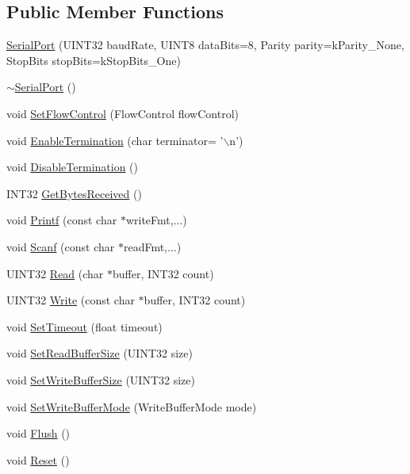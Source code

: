 \subsection*{Public Member Functions}
\begin{DoxyCompactItemize}
\item 
\hyperlink{classSerialPort_a52c48c5f1dd124a65008640efd4d1cd6}{SerialPort} (UINT32 baudRate, UINT8 dataBits=8, Parity parity=kParity\_\-None, StopBits stopBits=kStopBits\_\-One)
\item 
\hyperlink{classSerialPort_a8e09f366ed9b26b0456b66ae7bd8c702}{$\sim$SerialPort} ()
\item 
void \hyperlink{classSerialPort_ad1163b360e467c7c49fcd8467f8d30ad}{SetFlowControl} (FlowControl flowControl)
\item 
void \hyperlink{classSerialPort_a90e27c4191d7ac4e46c614f562505b68}{EnableTermination} (char terminator= '$\backslash$n')
\item 
void \hyperlink{classSerialPort_a347f5209ef059b6e53dbf5aaa397e3ac}{DisableTermination} ()
\item 
INT32 \hyperlink{classSerialPort_aa6894f04f38d747737b3c4dc721c03ea}{GetBytesReceived} ()
\item 
void \hyperlink{classSerialPort_a7e6079639bb99639ab7b89353a55ed28}{Printf} (const char $\ast$writeFmt,...)
\item 
void \hyperlink{classSerialPort_a59c35256ee16b2afa2012e2dbd7f5c20}{Scanf} (const char $\ast$readFmt,...)
\item 
UINT32 \hyperlink{classSerialPort_af414526bcb7b6b227d3efcb8a37c7bdc}{Read} (char $\ast$buffer, INT32 count)
\item 
UINT32 \hyperlink{classSerialPort_a95e5422930b1f9c90e3857a973d9170e}{Write} (const char $\ast$buffer, INT32 count)
\item 
void \hyperlink{classSerialPort_aa3ad209dd5ab32427fccf711b476d8bf}{SetTimeout} (float timeout)
\item 
void \hyperlink{classSerialPort_af361b5d5d045d6d36df507a3006c7cb1}{SetReadBufferSize} (UINT32 size)
\item 
void \hyperlink{classSerialPort_a819775c096d0a679d0aad4ee420413a4}{SetWriteBufferSize} (UINT32 size)
\item 
void \hyperlink{classSerialPort_a1fd9a6370da04fee0bdc978d04a95c78}{SetWriteBufferMode} (WriteBufferMode mode)
\item 
void \hyperlink{classSerialPort_aea93ced7190870183d46f7aa303b45f6}{Flush} ()
\item 
void \hyperlink{classSerialPort_ab00d8ab877678575767459e9166f775d}{Reset} ()
\end{DoxyCompactItemize}


